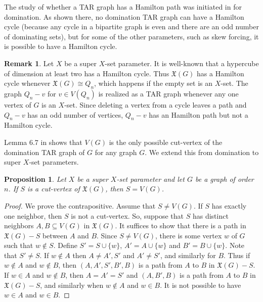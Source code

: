 \documentclass{article}
\numberwithin{figure}{section}
\numberwithin{table}{section}
\numberwithin{equation}{section}
\newtheorem{prop}[thm]{Proposition}
\theoremstyle{definition}
\newtheorem{rem}[thm]{Remark}
\theoremstyle{definition}
\theoremstyle{definition}
\newcommand{\bpf}{\begin{proof}}
\newcommand{\epf}{\end{proof}\ms}
\newcommand{\ms}{\medskip}
\newcommand{\ol}{\overline}
\newcommand{\xbar}{\ol X}
\newcommand{\xtar}{\mathfrak{X}}%
\newcommand{\dtar}{\mathfrak{D}}%
\begin{document}
{The study of whether a TAR graph has a Hamilton path was initiated in \cite{WIGArecon} for domination.  As shown there, no domination TAR graph can have a Hamilton cycle (because any cycle in a bipartite graph is even and there are an odd number of dominating sets), but for some of the other parameters, such as skew forcing, it is possible to have a Hamilton cycle.


\begin{rem}\label{r:QnHam}  Let $X$ be a super $X$-set parameter.   It is well-known that a  hypercube of dimension at least two has a Hamilton cycle.  Thus $\xtar(G)$ has a Hamilton cycle whenever $\xtar(G)\cong Q_n$, which happens if the empty set is an $X$-set. The graph $Q_n-v$ for $v\in V(Q_n)$ is realized as a TAR graph whenever any one vertex of $G$ is an $X$-set. Since deleting a vertex from a cycle leaves a path and $Q_n-v$ has an odd number of vertices, $Q_n-v$ has an Hamilton path but not a Hamilton cycle.  
\end{rem}

 Lemma 6.7 in \cite{WIGArecon} shows that $V(G)$ %
is the only possible cut-vertex of  the domination TAR graph of $G$ %
  for any graph $G$. We extend this from domination to super $X$-set parameters. %
 
\begin{prop}\label{p:cut-vtx}
Let $X$ be a super $X$-set parameter and let $G$  be a  graph of order $n$. %
If $S$  is a cut-vertex of  $\xtar(G)$, then $S=V(G)$. 
\end{prop}

\bpf 
 We prove the contrapositive.  Assume that $S\ne V(G)$. If $S$ has exactly one neighbor, then $S$ is not a cut-vertex. So, suppose that $S$ has distinct neighbors $A,B\subseteq V(G)$ in $\xtar(G)$.  It suffices to show that there is a path in $\xtar(G)-S$ between $A$ and $B$.  %
Since $S\ne V(G)$, there is some vertex $w$ of $G$ such that $w\not\in S$. Define $S'=S\cup\{w\}$, $A'=A\cup\{w\}$ and $B'=B\cup\{w\}$.  Note that $S'\ne S$.   If $w\not\in A$ then $ A\ne A',S'$ and  $A'\ne S'$, and similarly for $B$.  
Thus if  $w\not\in A$ and $w\not\in B$, then $(A,A',S', B',B)$ is a path from $A$ to $B$ in $\xtar(G)-S$.  If  $w\in A$ and  $w\not\in B$, then $A=A'=S'$ and $(A,B',B)$ is a path from $A$ to $B$ in $\xtar(G)-S$, and similarly when $w\not\in A$ and  $w\in B$.  It is not possible to have $w\in A$ and $w\in B$.
\epf

}
\end{document}
